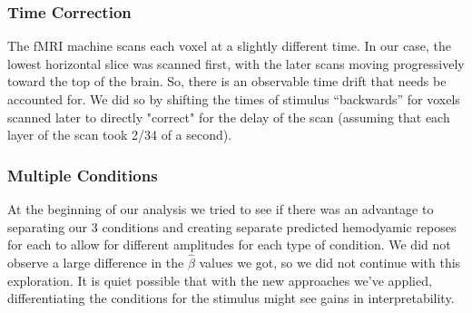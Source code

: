 \subsubsection{Time Correction}

The fMRI machine scans each voxel at a slightly different time. In our case, 
the lowest horizontal slice was scanned first, with the later scans moving 
progressively toward the top of the brain. So, there is an observable time drift 
that needs be accounted for. We did so by shifting the times of stimulus 
``backwards'' for voxels scanned later to directly "correct" for the delay of the 
scan (assuming that each layer of the scan took 2/34 of a second).

\subsubsection{Multiple Conditions}

At the beginning of our analysis we tried to see if there was an advantage to 
separating our 3 conditions and creating separate predicted hemodyamic reposes 
for each to allow for different amplitudes for each type of condition. We did 
not observe a large difference in the $\hat{\beta}$ values we got, so we did not 
continue with this exploration. It is quiet possible that with the new approaches 
we've applied, differentiating the conditions for the stimulus might see gains in 
interpretability.


